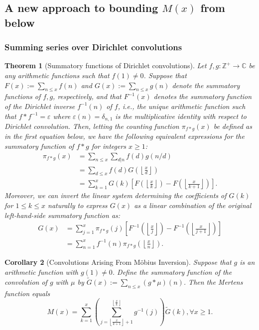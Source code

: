 \documentclass[11pt,reqno,a4letter]{article}
\numberwithin{figure}{section}
\numberwithin{table}{section}
\newcommand{\floor}[1]{\left\lfloor #1 \right\rfloor}
\newcommand{\Floor}[2]{\ensuremath{\left\lfloor \frac{#1}{#2} \right\rfloor}}
\theoremstyle{plain}
\newtheorem{theorem}{Theorem}
\newtheorem{cor}[theorem]{Corollary}
\numberwithin{theorem}{section}
\theoremstyle{definition}
\begin{document}
\subsection{A new approach to bounding $M(x)$ from below} 

\subsubsection{Summing series over Dirichlet convolutions} 

\begin{theorem}[Summatory functions of Dirichlet convolutions] 
\label{theorem_SummatoryFuncsOfDirCvls} 
Let $f,g: \mathbb{Z}^{+} \rightarrow \mathbb{C}$ be any arithmetic functions such that $f(1) \neq 0$. 
Suppose that $F(x) := \sum_{n \leq x} f(n)$ and $G(x) := \sum_{n \leq x} g(n)$ denote the summatory 
functions of $f,g$, respectively, and that $F^{-1}(x)$ denotes the summatory function of the 
Dirichlet inverse $f^{-1}(n)$ of $f$, i.e., the unique arithmetic function such that 
$f \ast f^{-1} = \varepsilon$ where $\varepsilon(n) = \delta_{n,1}$ is the multiplicative identity 
with respect to Dirichlet convolution. Then, letting the counting function $\pi_{f \ast g}(x)$ be defined 
as in the first equation below, we have the following equivalent expressions for the 
summatory function of $f \ast g$ for integers $x \geq 1$: 
\begin{align*} 
\pi_{f \ast g}(x) & = \sum_{n \leq x} \sum_{d|n} f(d) g(n/d) \\ 
     & = \sum_{d \leq x} f(d) G\left(\Floor{x}{d}\right) \\ 
     & = \sum_{k=1}^{x} G(k) \left[F\left(\Floor{x}{k}\right) - 
     F\left(\Floor{x}{k+1}\right)\right]. 
\end{align*} 
Moreover, we can invert the linear system determining the coefficients of $G(k)$ for $1 \leq k \leq x$ 
naturally to express $G(x)$ as a linear combination of the original left-hand-side summatory function as:
\begin{align*} 
G(x) & = \sum_{j=1}^{x} \pi_{f \ast g}(j) \left[F^{-1}\left(\Floor{x}{j}\right) - 
     F^{-1}\left(\Floor{x}{j+1}\right)\right] \\ 
     & = \sum_{n=1}^{x} f^{-1}(n) \pi_{f \ast g}\left(\Floor{x}{n}\right). 
\end{align*} 
\end{theorem} 

\begin{cor}[Convolutions Arising From M\"obius Inversion] 
\label{cor_CvlGAstMu} 
Suppose that $g$ is an arithmetic function with $g(1) \neq 0$. Define the summatory function of 
the convolution of $g$ with $\mu$ by $\widetilde{G}(x) := \sum_{n \leq x} (g \ast \mu)(n)$. 
Then the Mertens function equals 
\[
M(x) = \sum_{k=1}^{x} \left(\sum_{j=\floor{\frac{x}{k+1}}+1}^{\floor{\frac{x}{k}}} g^{-1}(j)\right) 
     \widetilde{G}(k), \forall x \geq 1. 
\]
\end{cor} 
\end{document}
